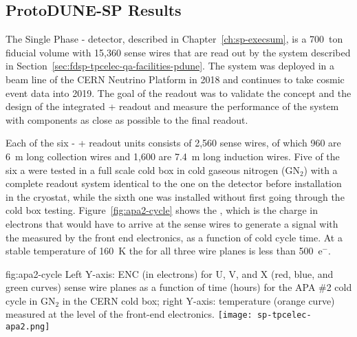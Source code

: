 \subsection{ProtoDUNE-SP Results}
\label{sec:fdsp-tpcelec-overview-pdune}

The Single Phase - detector, described 
in Chapter~\ref{ch:sp-execsum}, is a 700~ton fiducial volume 
 with 15,360 sense wires that are read out by 
the  system described in Section~\ref{sec:fdsp-tpcelec-qa-facilities-pdune}. 
The system was deployed in a beam line of the CERN Neutrino Platform 
in 2018 and continues to take cosmic event data into 2019. The goal of 
the   readout was to validate the concept 
and the design of the integrated + readout 
and measure the performance of the  system with components 
as close as possible to the final   readout.

Each of the six - +
readout units consists of 2,560 sense wires, of which 960 are \SI{6}{m} 
long collection wires and 1,600 are \SI{7.4}{m} long induction wires. 
Five of the six a were tested in a full scale cold box in 
cold gaseous nitrogen (GN$_2$) with a complete  readout system 
identical to the one on the detector before installation in the cryostat,
while the sixth one was installed without first going through the cold
box testing. Figure~\ref{fig:apa2-cycle} shows the , which 
is the charge in electrons that would have to arrive at the sense 
wires to generate a signal with the \rms measured by the front end 
electronics, as a function of cold cycle time. At a stable temperature of 
\SI{160}{K} the  for all three wire planes is less than 500~e$^-$.

\begin{dunefigure}
{fig:apa2-cycle}
{Left Y-axis: ENC (in electrons) for U, V, and X (red, blue, and green 
curves) sense wire planes as a function of time (hours) for the APA \#2 cold 
cycle in GN$_2$ in the CERN cold box; right Y-axis: temperature 
(orange curve) measured at the level of the front-end electronics.}
\texttt{[image: sp-tpcelec-apa2.png]}
\end{dunefigure}

